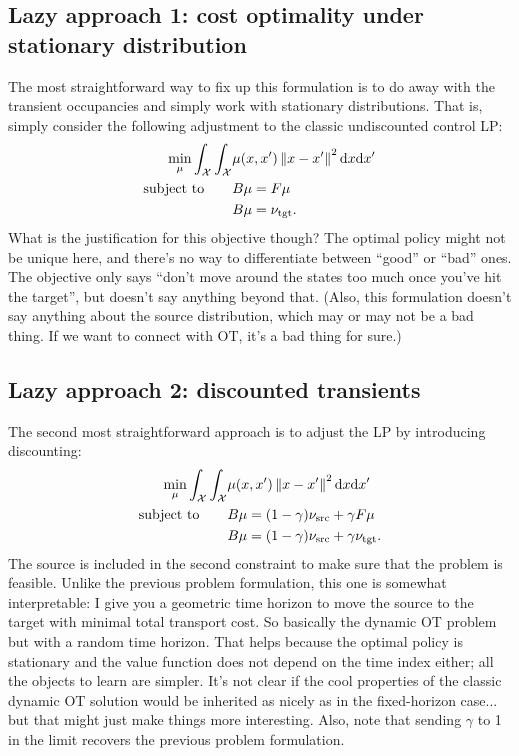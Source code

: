 \documentclass[twoside,10pt]{../jmlr}
\begin{document}
\subsection{Lazy approach 1: cost optimality under stationary distribution}
The most straightforward way to fix up this formulation is to do away with the transient occupancies and simply work 
with stationary distributions. That is, simply consider the following adjustment to the classic undiscounted control LP:
\begin{align*}
 \min_{\mu} \int_{\mathcal{X}} \int_{\mathcal{X}} &\mu(x,x') \left\lVert x-x'\right\rVert^2 \mathrm{d} x \mathrm{d} x'
 \\
 \mbox{subject to} \qquad & B\mu = F\mu
 \\
 & B\mu = \nu_{\text{tgt}}.
\end{align*}
What is the justification for this objective though? The optimal policy might not be unique here, and there's no way to 
differentiate between ``good'' or ``bad'' ones. The objective only says ``don't move around the states too much once 
you've hit the target'', but doesn't say anything beyond that. (Also, this formulation doesn't say anything about the 
source distribution, which may or may not be a bad thing. If we want to connect with OT, it's a bad thing for sure.)

\subsection{Lazy approach 2: discounted transients}
The second most straightforward approach is to adjust the LP by introducing discounting:
\begin{align*}
 \min_{\mu} \int_{\mathcal{X}} \int_{\mathcal{X}} &\mu(x,x') \left\lVert x-x'\right\rVert^2 \mathrm{d} x \mathrm{d} x'
 \\
 \mbox{subject to} \qquad & B\mu = (1-\gamma)\nu_{\text{src}} + \gamma F\mu
 \\
 & B\mu = (1-\gamma)\nu_{\text{src}} + \gamma \nu_{\text{tgt}}.
\end{align*}
The source is included in the second constraint to make sure that the problem is feasible. Unlike the previous problem 
formulation, this one is somewhat interpretable: I give you a geometric time horizon to move the source to the target 
with minimal total transport cost. So basically the dynamic OT problem but with a random time horizon. That helps 
because the optimal policy is stationary and the value function does not depend on the time index either; all the 
objects to learn are simpler. It's not clear if the cool properties of the classic dynamic OT solution would be 
inherited as nicely as in the fixed-horizon case... but that might just make things more interesting. Also, note that 
sending $\gamma$ to 1 in the limit recovers the previous problem formulation.












\end{document}
